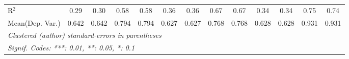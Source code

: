 \begin{tabular}{lcccccccccccc}
   R$^2$                                    & 0.29          & 0.30           & 0.58          & 0.58          & 0.36          & 0.36          & 0.67        & 0.67    & 0.34          & 0.34           & 0.75    & 0.74\\  
Mean(Dep. Var.) & 0.642 & 0.642 & 0.794 & 0.794 & 0.627 & 0.627 & 0.768 & 0.768 & 0.628 & 0.628 & 0.931 & 0.931 \\
   \midrule \midrule
   \multicolumn{13}{l}{\emph{Clustered (author) standard-errors in parentheses}}\\
   \multicolumn{13}{l}{\emph{Signif. Codes: ***: 0.01, **: 0.05, *: 0.1}}\\
\end{tabular}
\par\endgroup
